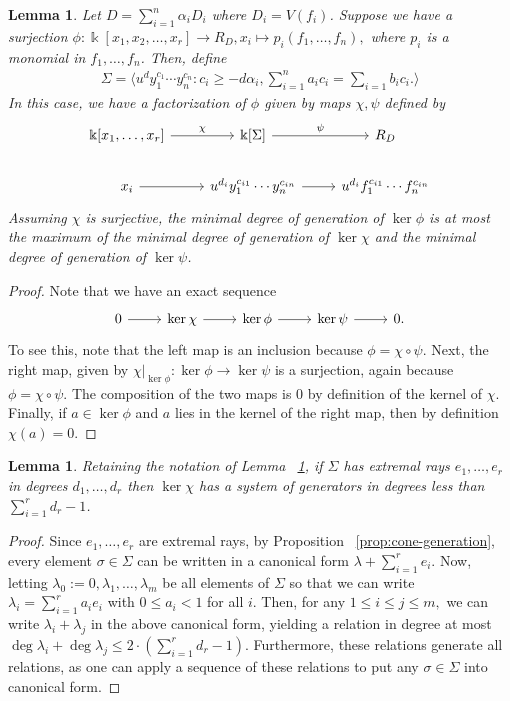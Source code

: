 \documentclass{amsart}
\theoremstyle{plain}
\newtheorem{lem}[thm]{Lemma}
\theoremstyle{definition}
\theoremstyle{remark}
\numberwithin{equation}{section}
\newcommand\bk{{\Bbbk}}
\newcommand\bida{a}
\newcommand\bidb{b}
\begin{document}
\begin{lem}
\label{lem:composite-map}
Let $D = \sum_{i=1}^{n}\alpha_i D_i$ where $D_i = V(f_i)$. Suppose we have a surjection $\phi: \bk[x_1,x_2,\ldots, x_r] \rightarrow R_D, x_i \mapsto p_i(f_1, \ldots, f_n),$ where $p_i$ is a monomial in $f_1,\ldots, f_n$. Then, define
\begin{align*}
	\Sigma = \langle u^d y_1^{c_1} \cdots y_n^{c_n} : c_i \geq -d \alpha_i, \sum_{i=1}^{n} \bida_i c_i = \sum_{i=1}^{} \bidb_i c_i. \rangle 
\end{align*}
In this case, we have a factorization of $\phi$ given by maps $\chi, \psi$ defined by
$$\begin{tikzcd}
\bk[x_1,\ldots, x_r] \ar {r}{\chi} & \bk[\Sigma] \ar {r}{\psi} & R_D \\
x_i \ar r & u^{d_i}y_1^{c_{i1}} \cdots y_n^{c_{in}} \ar r & u^{d_i}f_1^{c_{i1}} \cdots f_n^{c_{in}}
\end{tikzcd}$$
Assuming $\chi$ is surjective, the minimal degree of generation of $\ker \phi$ is at most the maximum of the minimal degree of generation of $\ker \chi$ and the minimal degree of generation of $\ker \psi$.
\end{lem}
\begin{proof}
Note that we have an exact sequence
$$\begin{tikzcd}
0 \ar r & \ker \chi \ar r & \ker \phi \ar r & \ker \psi \ar r & 0.
\end{tikzcd}$$
To see this, note that the left map is an inclusion because $\phi = \chi \circ \psi$. Next, the right map, given by $\chi|_{\ker \phi}:\ker \phi \rightarrow \ker \psi$ is a surjection, again because $\phi = \chi \circ \psi$. The composition of the two maps is $0$ by definition of the kernel of $\chi$. Finally, if $a \in \ker \phi$ and $a$ lies in the kernel of the right map, then by definition $\chi(a) = 0$.
\end{proof}

\begin{lem}
\label{lem:bound-ker-chi}
Retaining the notation of Lemma ~\ref{lem:composite-map}, if $\Sigma$ has extremal rays $e_1,\ldots, e_r$ in degrees $d_1, \ldots, d_r$ then $\ker \chi$ has a system of generators in degrees less than $\sum_{i=1}^{r}d_r-1$.
\end{lem}
\begin{proof}
\todo{define $\bida$ and $\bidb$}
Since $e_1, \ldots, e_r$ are extremal rays, by Proposition ~\ref{prop:cone-generation}, every element $\sigma \in \Sigma$ can be written in a canonical form $\lambda + \sum_{i=1}^{r}e_i$. Now, letting $\lambda_0 := 0,\lambda_1, \ldots, \lambda_m$ be all elements of $\Sigma$ so that we can write $\lambda_i = \sum_{i=1}^{r}\bida_i e_i$ with $0 \leq \bida_i < 1$ for all $i$. Then, for any $1 \leq i \leq j \leq m,$ we can write $\lambda_i + \lambda_j$ in the above canonical form, yielding a relation in degree at most $\deg \lambda_i + \deg \lambda_j \leq 2 \cdot \left( \sum_{i=1}^{r}d_r -1 \right).$ Furthermore, these relations generate all relations, as one can apply a sequence of these relations to put any $\sigma \in \Sigma$ into canonical form.
\end{proof}
\end{document}
